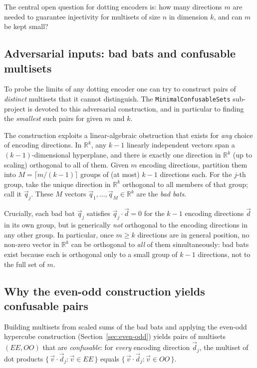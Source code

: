 \documentclass[12pt,a4paper]{article}
\begin{document}
The central open question for dotting encoders is: how many directions $m$ are
needed to guarantee injectivity for multisets of size $n$ in dimension $k$, and
can $m$ be kept small?

\subsection*{Adversarial inputs: bad bats and confusable multisets}

To probe the limits of any dotting encoder one can try to construct pairs of
\emph{distinct} multisets that it cannot distinguish.  The
\texttt{MinimalConfusableSets} sub-project is devoted to this adversarial
construction, and in particular to finding the \emph{smallest} such pairs for
given $m$ and $k$.

The construction exploits a linear-algebraic obstruction that exists for
\emph{any} choice of encoding directions. In $\mathbb{R}^k$, any $k-1$
linearly independent vectors span a $(k-1)$-dimensional hyperplane, and there
is exactly one direction in $\mathbb{R}^k$ (up to scaling) orthogonal to all
of them. Given $m$ encoding directions, partition them into
$M = \lceil m/(k-1) \rceil$ groups of (at most) $k-1$ directions each. For
the $j$-th group, take the unique direction in $\mathbb{R}^k$ orthogonal to
all members of that group; call it $\vec{q}_j$. These $M$ vectors
$\vec{q}_1, \ldots, \vec{q}_M \in \mathbb{R}^k$ are the \emph{bad bats}.

Crucially, each bad bat $\vec{q}_j$ satisfies $\vec{q}_j \cdot \vec{d} = 0$
for the $k-1$ encoding directions $\vec{d}$ in its own group, but is
generically \emph{not} orthogonal to the encoding directions in any other
group. In particular, once $m \geq k$ directions are in general position, no
non-zero vector in $\mathbb{R}^k$ can be orthogonal to \emph{all} of them
simultaneously: bad bats exist because each is orthogonal only to a small
group of $k-1$ directions, not to the full set of $m$.

\subsection*{Why the even-odd construction yields confusable pairs}

Building multisets from scaled sums of the bad bats and applying the
even-odd hypercube construction (Section~\ref{sec:even-odd}) yields pairs of
multisets $(EE, OO)$ that are \emph{confusable}: for \emph{every} encoding
direction $\vec{d}_j$, the multiset of dot products
$\{\,\vec{v} \cdot \vec{d}_j : \vec{v} \in EE\,\}$ equals
$\{\,\vec{v} \cdot \vec{d}_j : \vec{v} \in OO\,\}$.
\end{document}
